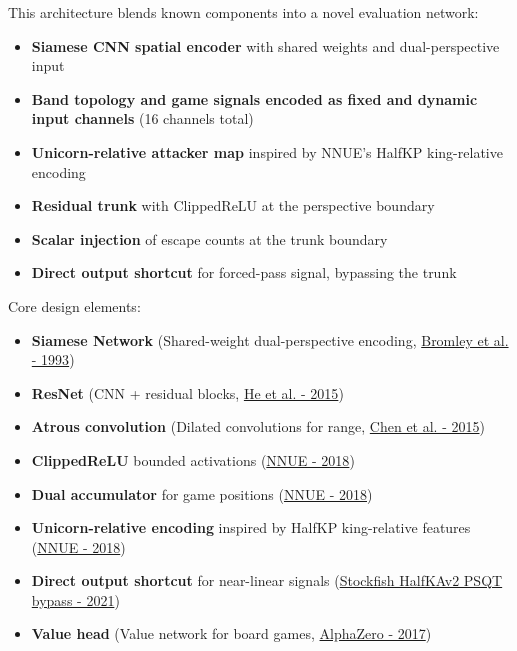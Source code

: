\documentclass[11pt,a4paper]{article}
\begin{document}
This architecture blends known components into a novel evaluation network:
\begin{itemize}
  \item \textbf{Siamese CNN spatial encoder} with shared weights and dual-perspective input
  \item \textbf{Band topology and game signals encoded as fixed and dynamic input channels} (16 channels total)
  \item \textbf{Unicorn-relative attacker map} inspired by NNUE's HalfKP king-relative encoding
  \item \textbf{Residual trunk} with ClippedReLU at the perspective boundary
  \item \textbf{Scalar injection} of escape counts at the trunk boundary
  \item \textbf{Direct output shortcut} for forced-pass signal, bypassing the trunk
\end{itemize}

Core design elements:
\begin{itemize}
  \item \textbf{Siamese Network} (Shared-weight dual-perspective encoding, \href{https://papers.nips.cc/paper/1993/hash/0d4262ad58b4d3866d5aa0f4f9e1c06b-Abstract.html}{Bromley et al. - 1993})
  \item \textbf{ResNet} (CNN + residual blocks, \href{https://arxiv.org/abs/1512.03385}{He et al. - 2015})
  \item \textbf{Atrous convolution} (Dilated convolutions for range, \href{https://arxiv.org/abs/1511.07122}{Chen et al. - 2015})
  \item \textbf{ClippedReLU} bounded activations (\href{https://official-stockfish.github.io/docs/nnue-pytorch-wiki/docs/nnue.html}{NNUE - 2018})
  \item \textbf{Dual accumulator} for game positions (\href{https://official-stockfish.github.io/docs/nnue-pytorch-wiki/docs/nnue.html}{NNUE - 2018})
  \item \textbf{Unicorn-relative encoding} inspired by HalfKP king-relative features (\href{https://official-stockfish.github.io/docs/nnue-pytorch-wiki/docs/nnue.html}{NNUE - 2018})
  \item \textbf{Direct output shortcut} for near-linear signals (\href{https://github.com/official-stockfish/Stockfish/blob/master/src/nnue/nnue_architecture.h}{Stockfish HalfKAv2 PSQT bypass - 2021})
  \item \textbf{Value head} (Value network for board games, \href{https://arxiv.org/abs/1712.01815}{AlphaZero - 2017})
\end{itemize}
\end{document}
